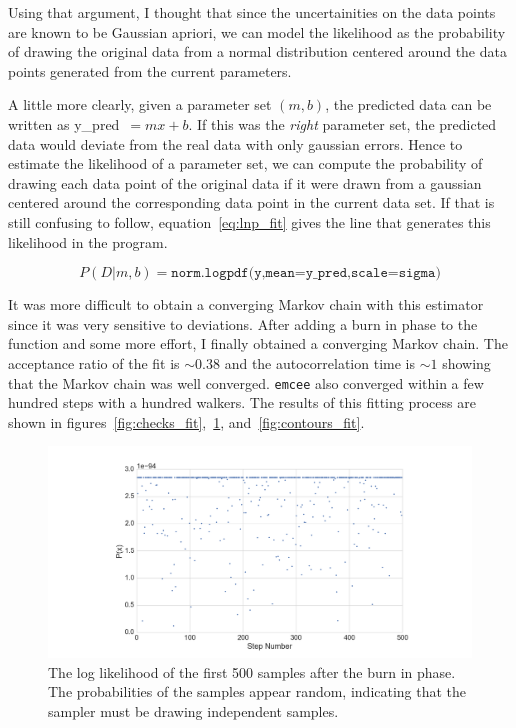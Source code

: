 \documentclass[12pt,usletter,english]{article}
\begin{document}
Using that argument, I thought that since the uncertainities on
the data points are known to be Gaussian apriori, we can model the
likelihood as the probability of drawing the original data from a
normal distribution centered around the data points generated from the
current parameters.

A little more clearly, given a parameter set $(m,b)$, the predicted
data can be written as y\_pred~$=mx+b$. If this was the \textit{right}
parameter set, the predicted data would deviate from the real data
with only gaussian errors. Hence to estimate the likelihood of a
parameter set, we can compute the probability of drawing each data
point of the original data if it were drawn from a gaussian centered
around the corresponding data point in the current data set. If that
is still confusing to follow, equation~\ref{eq:lnp_fit} gives the line
that generates this likelihood in the program.

\begin{equation}
  \label{eq:lnp_fit}
  P(D|m,b) = \texttt{norm.logpdf(y,mean=y\_pred,scale=sigma)}
\end{equation}

It was more difficult to obtain a converging Markov chain with this
estimator since it was very sensitive to deviations. After adding a
burn in phase to the function and some more effort, I finally obtained
a converging Markov chain. The acceptance ratio of the fit is $\sim
0.38$ and the autocorrelation time is $\sim 1$ showing that the Markov
chain was well converged. \texttt{emcee} also converged within a few
hundred steps with a hundred walkers. The results of this fitting
process are shown in figures~\ref{fig:checks_fit},~\ref{fig:lnp_fit},
and~\ref{fig:contours_fit}.

\begin{figure}[!h]
  \centering \includegraphics[width=13cm]{lnp_fit.png}
  \caption{The log likelihood of the first 500 samples after the burn
    in phase. The probabilities of the samples appear random,
    indicating that the sampler must be drawing independent samples.
    \label{fig:lnp_fit}}
\end{figure}
\end{document}
